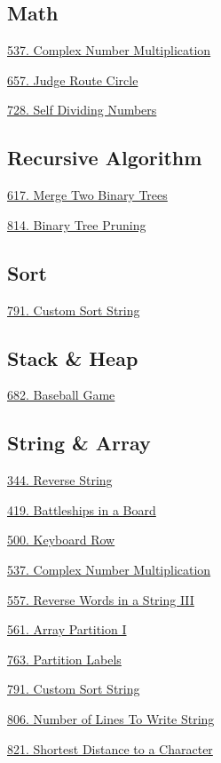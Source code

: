 \subsection*{Math}
\begin{flushleft}
    \hyperref[algo:537]{537. Complex Number Multiplication}

    \hyperref[algo:657]{657. Judge Route Circle}
    
    \hyperref[algo:728]{728. Self Dividing Numbers}
\end{flushleft}

\subsection*{Recursive Algorithm}
\begin{flushleft}
    \hyperref[algo:617]{617. Merge Two Binary Trees}

    \hyperref[algo:814]{814. Binary Tree Pruning}
\end{flushleft}

\subsection*{Sort}
\begin{flushleft}
    \hyperref[algo:791]{791. Custom Sort String}
\end{flushleft}

\subsection*{Stack \& Heap}
\begin{flushleft}
    \hyperref[algo:682]{682. Baseball Game}
\end{flushleft}

\subsection*{String \& Array}
\begin{flushleft}
    \hyperref[algo:344]{344. Reverse String}

    \hyperref[algo:419]{419. Battleships in a Board}

    \hyperref[algo:500]{500. Keyboard Row}

    \hyperref[algo:537]{537. Complex Number Multiplication}

    \hyperref[algo:557]{557. Reverse Words in a String III}

    \hyperref[algo:561]{561. Array Partition I}
    
    \hyperref[algo:763]{763. Partition Labels}
    
    \hyperref[algo:791]{791. Custom Sort String}
    
    \hyperref[algo:806]{806. Number of Lines To Write String}
    
    \hyperref[algo:821]{821. Shortest Distance to a Character}
\end{flushleft}
